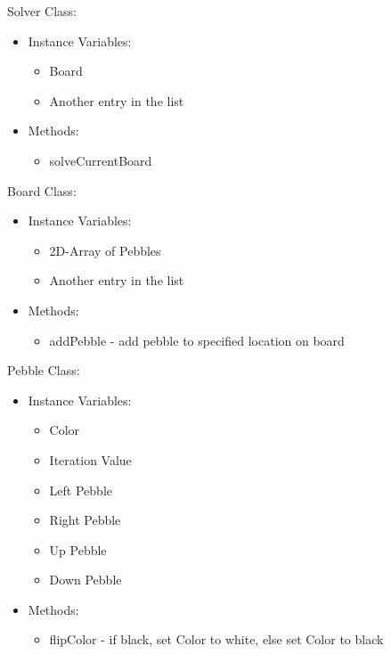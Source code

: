 \documentclass{article}
\begin{document}
Solver Class:
\begin{itemize}
	\item Instance Variables: 
	\begin{itemize}
  		\item Board
  		\item Another entry in the list
	\end{itemize}
	\item Methods:
	\begin{itemize}
		\item solveCurrentBoard
	\end{itemize}
\end{itemize}
Board Class:
\begin{itemize}
	\item Instance Variables: 
	\begin{itemize}
  		\item 2D-Array of Pebbles
  		\item Another entry in the list
	\end{itemize}
	\item Methods:
	\begin{itemize}
		\item addPebble - add pebble to specified location on board
	\end{itemize}
\end{itemize}
Pebble Class:
\begin{itemize}
	\item Instance Variables: 
	\begin{itemize}
  		\item Color
  		\item Iteration Value
  		\item Left Pebble
  		\item Right Pebble
  		\item Up Pebble
  		\item Down Pebble
	\end{itemize}
	\item Methods:
	\begin{itemize}
		\item flipColor - if black, set Color to white, else set Color to black
	\end{itemize}
\end{itemize}
\end{document}
